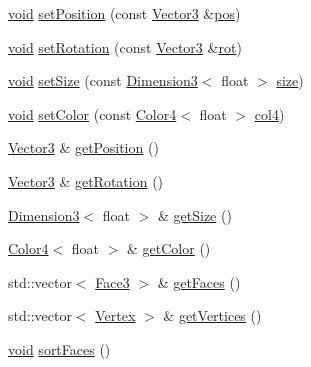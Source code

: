 \begin{DoxyCompactItemize}
\item 
\hyperlink{glutf90_8h_ac778d6f63f1aaf8ebda0ce6ac821b56e}{void} \hyperlink{class_geom_base_a2f791ec87256e94cfb904ea4781e9067}{set\-Position} (const \hyperlink{class_vector3}{Vector3} \&\hyperlink{class_geom_base_ace2fc0557767dbb702aaf1655a85ed92}{pos})
\item 
\hyperlink{glutf90_8h_ac778d6f63f1aaf8ebda0ce6ac821b56e}{void} \hyperlink{class_geom_base_ace131749842b2d1bc8f84c31b04062fc}{set\-Rotation} (const \hyperlink{class_vector3}{Vector3} \&\hyperlink{class_geom_base_a7de363bab1e976c73e495cf973a51de7}{rot})
\item 
\hyperlink{glutf90_8h_ac778d6f63f1aaf8ebda0ce6ac821b56e}{void} \hyperlink{class_geom_base_a4466237c7798bf2139dae782e48a759f}{set\-Size} (const \hyperlink{class_dimension3}{Dimension3}$<$ float $>$ \hyperlink{gl3_8h_a79ef9eb3e59c4bb34c4b9fbeb8d28ff7}{size})
\item 
\hyperlink{glutf90_8h_ac778d6f63f1aaf8ebda0ce6ac821b56e}{void} \hyperlink{class_geom_base_a8bf68aafc4c2abaabc76ccc25a07b194}{set\-Color} (const \hyperlink{class_color4}{Color4}$<$ float $>$ \hyperlink{class_geom_base_acd58b67fcdac4428f66bea2c58c3aad8}{col4})
\item 
\hyperlink{class_vector3}{Vector3} \& \hyperlink{class_geom_base_acb68ae1ee36f69af0061f513845b1b68}{get\-Position} ()
\item 
\hyperlink{class_vector3}{Vector3} \& \hyperlink{class_geom_base_a099e7104e7ee1fe9d7f6fad94bf1b996}{get\-Rotation} ()
\item 
\hyperlink{class_dimension3}{Dimension3}$<$ float $>$ \& \hyperlink{class_geom_base_a4837a0f2d85a917a61eec1d1cb67f8d9}{get\-Size} ()
\item 
\hyperlink{class_color4}{Color4}$<$ float $>$ \& \hyperlink{class_geom_base_a9b272fc89d2c29c9a64ab573624fa279}{get\-Color} ()
\item 
std\-::vector$<$ \hyperlink{class_face3}{Face3} $>$ \& \hyperlink{class_geom_base_afc2f6a684afc994e627b2d67c79485fd}{get\-Faces} ()
\item 
std\-::vector$<$ \hyperlink{class_vertex}{Vertex} $>$ \& \hyperlink{class_geom_base_aa735fa06a3056ba24fa1dcd3d70b3756}{get\-Vertices} ()
\item 
\hyperlink{glutf90_8h_ac778d6f63f1aaf8ebda0ce6ac821b56e}{void} \hyperlink{class_geom_base_a19dcf3697cebd27060e9389263dd44b7}{sort\-Faces} ()
\end{DoxyCompactItemize}
